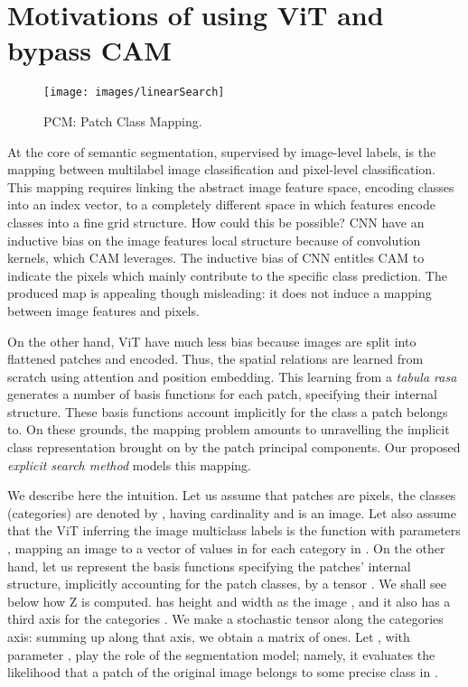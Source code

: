 \documentclass[runningheads]{styles/llncs}
\begin{document}
\section{Motivations of using ViT and bypass CAM}\label{sec:motivations}
\begin{figure}[t]
\centering
\texttt{[image: images/linearSearch]}
\caption{PCM: Patch Class Mapping.} \label{fig:lls}
\end{figure}
At the core of semantic segmentation, supervised by image-level labels, is the mapping between multilabel image classification and pixel-level classification. 
This mapping requires linking the abstract image feature space, encoding classes into an index vector, to a completely different space in which features encode classes into a fine grid structure.  
How could this be possible? CNN have an inductive bias on the image features local structure because of convolution kernels,  which  CAM leverages. The inductive bias of CNN entitles CAM to indicate the pixels which mainly contribute to the specific class prediction. The produced map is appealing though misleading: it does not induce a mapping between image features and pixels. 

On the other hand, ViT \cite{dosovitskiy2021image} have much less bias because images are split into flattened patches and encoded. Thus, the spatial relations are learned from scratch using attention and position embedding. This learning from a {\em tabula rasa} generates a number of basis functions for each patch, specifying their internal structure. These basis functions account implicitly for the class a patch belongs to. On these grounds, the mapping problem amounts to unravelling the implicit class representation brought on by the patch principal components. Our proposed {\em explicit search method} models this mapping.

We describe here the intuition. Let us assume that patches are pixels, the classes (categories) are denoted by , having cardinality  and  is an image. Let also assume that the ViT inferring the image multiclass labels is the function  with parameters , mapping an image  to a vector of values in  for each category in . On the other hand, let us represent the basis functions specifying the patches' internal structure, implicitly accounting for the patch classes, by a tensor . We shall see below how Z is computed.  has height and width as the image , and it also has a third axis for the categories . We make  a stochastic tensor along the categories axis: summing up along that axis, we obtain a matrix of ones. Let , with parameter , play the role of the segmentation model; namely, it evaluates the likelihood that a patch of the original image belongs to some precise class in . 
\end{document}
